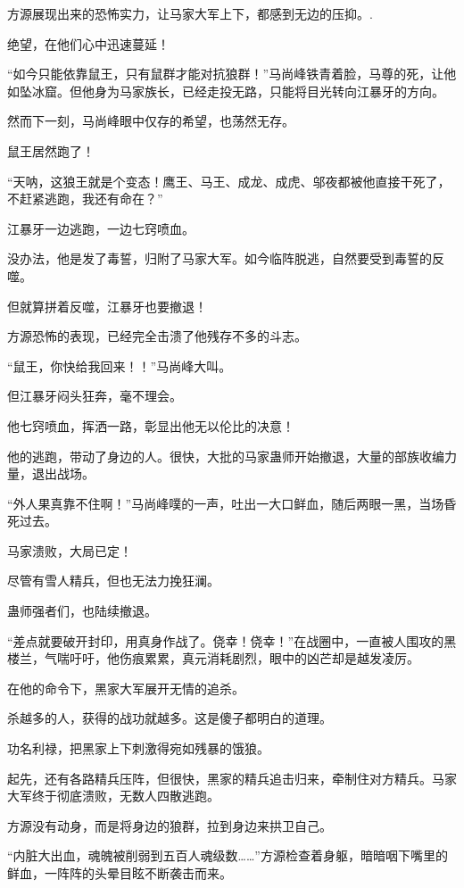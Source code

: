 
\begin{this_body}

方源展现出来的恐怖实力，让马家大军上下，都感到无边的压抑。.

绝望，在他们心中迅速蔓延！

“如今只能依靠鼠王，只有鼠群才能对抗狼群！”马尚峰铁青着脸，马尊的死，让他如坠冰窟。但他身为马家族长，已经走投无路，只能将目光转向江暴牙的方向。

然而下一刻，马尚峰眼中仅存的希望，也荡然无存。

鼠王居然跑了！

“天呐，这狼王就是个变态！鹰王、马王、成龙、成虎、邬夜都被他直接干死了，不赶紧逃跑，我还有命在？”

江暴牙一边逃跑，一边七窍喷血。

没办法，他是发了毒誓，归附了马家大军。如今临阵脱逃，自然要受到毒誓的反噬。

但就算拼着反噬，江暴牙也要撤退！

方源恐怖的表现，已经完全击溃了他残存不多的斗志。

“鼠王，你快给我回来！！”马尚峰大叫。

但江暴牙闷头狂奔，毫不理会。

他七窍喷血，挥洒一路，彰显出他无以伦比的决意！

他的逃跑，带动了身边的人。很快，大批的马家蛊师开始撤退，大量的部族收编力量，退出战场。

“外人果真靠不住啊！”马尚峰噗的一声，吐出一大口鲜血，随后两眼一黑，当场昏死过去。

马家溃败，大局已定！

尽管有雪人精兵，但也无法力挽狂澜。

蛊师强者们，也陆续撤退。

“差点就要破开封印，用真身作战了。侥幸！侥幸！”在战圈中，一直被人围攻的黑楼兰，气喘吁吁，他伤痕累累，真元消耗剧烈，眼中的凶芒却是越发凌厉。

在他的命令下，黑家大军展开无情的追杀。

杀越多的人，获得的战功就越多。这是傻子都明白的道理。

功名利禄，把黑家上下刺激得宛如残暴的饿狼。

起先，还有各路精兵压阵，但很快，黑家的精兵追击归来，牵制住对方精兵。马家大军终于彻底溃败，无数人四散逃跑。

方源没有动身，而是将身边的狼群，拉到身边来拱卫自己。

“内脏大出血，魂魄被削弱到五百人魂级数……”方源检查着身躯，暗暗咽下嘴里的鲜血，一阵阵的头晕目眩不断袭击而来。


\end{this_body}
